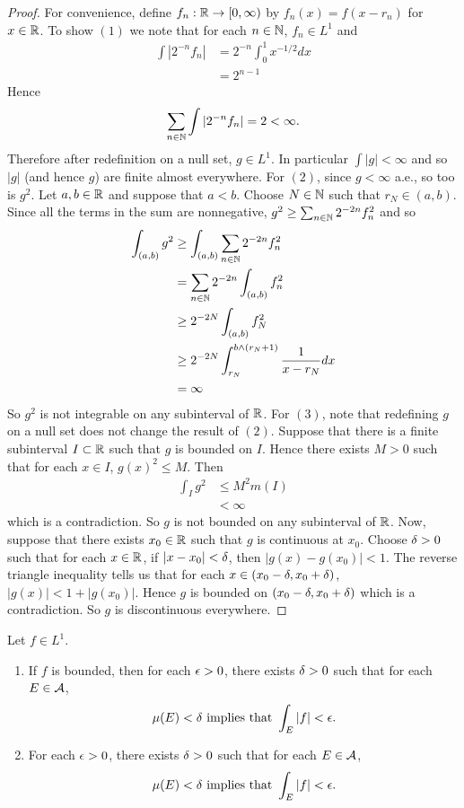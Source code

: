 \documentclass{book}
\begin{document}
	\begin{proof} For convenience, define $f_n: \mathbb{R} \rightarrow [0,\infty)$ by $f_n(x) = f(x-r_n)$ for $x \in \mathbb{R}$.
		To show $(1)$ we note that for each $n \in \mathbb{N}$, $f_n \in L^1$ and
		\begin{align*}
			\int |2^{-n} f_n| 
			&= 2^{-n}\int_0^1 x^{-1/2}dx\\ 
			&= 2^{n-1}
		\end{align*}
		Hence 
		$$\sum_{n \in \mathbb{N}} \int |2^{-n} f_n| = 2 < \infty.$$
		Therefore after redefinition on a null set, $g \in L^1.$ In particular $\int |g| < \infty$ and so $|g|$ (and hence $g$) are finite almost everywhere. For $(2)$, since $g < \infty$ a.e., so too is $g^{2}$. Let $a,b \in \mathbb{R}$ and suppose that $a<b$. Choose $N \in \mathbb{N}$ such that $r_N \in (a,b)$. Since all the terms in the sum are nonnegative, $g^{2} \geq \sum_{n \in \mathbb{N}} 2^{-2n}f_n^2$ and so 
		\begin{align*}
			\int_{(a,b)} g^2 
			&\geq \int_{(a,b)} \sum_{n \in \mathbb{N}} 2^{-2n}f_n^2\\
			&= \sum_{n \in \mathbb{N}} 2^{-2n} \int_{(a,b)} f_n^2\\
			&\geq 2^{-2N} \int_{(a,b)} f_N^2\\
			&\geq 2^{-2N} \int_{r_N}^{b \wedge (r_N+1)} \frac{1}{x-r_N} dx\\
			&= \infty
		\end{align*}
		So $g^2$ is not integrable on any subinterval of $\mathbb{R}$. For $(3)$, note that redefining $g$ on a null set does not change the result of $(2)$. Suppose that there is a finite subinterval $I \subset \mathbb{R}$ such that $g$ is bounded on $I$. Hence there exists $M >0$ such that for each $x \in I$, $g(x)^2 \leq M$. Then 
		\begin{align*}
			\int_I g^2
			&\leq M^2 m(I)\\
			&< \infty
		\end{align*}
		which is a contradiction. So $g$ is not bounded on any subinterval of $\mathbb{R}$. Now, suppose that there exists $x_0 \in \mathbb{R}$ such that $g$ is continuous at $x_0$. Choose $\delta > 0$ such that for each $x \in \mathbb{R}$, if $|x-x_0|< \delta$, then $|g(x) - g(x_0)| < 1$. The reverse triangle inequality tells us that for each $x \in (x_0-\delta, x_0 +\delta)$, $|g(x)| < 1 + |g(x_0)|$. Hence $g$ is bounded on $(x_0-\delta, x_0 +\delta)$ which is a contradiction. So $g$ is discontinuous everywhere.
	\end{proof}
	
	\begin{ex}  
		Let $f \in L^1$. 
		\begin{enumerate}
			\item If $f$ is bounded, then for each $\epsilon >0$, there exists $\delta >0$ such that for each $E \in \mathcal{A}$,  
			$$\mu(E) < \delta \text{ implies that } \int_E |f| < \epsilon .$$
			\item For each $\epsilon >0$, there exists $\delta >0$ such that for each $E \in \mathcal{A}$,  
			$$\mu(E) < \delta \text{ implies that } \int_E |f| < \epsilon .$$
		\end{enumerate} 
	\end{ex}
	
\end{document}
